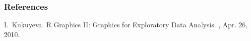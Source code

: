 \begin{frame}
	\frametitle{References}
		\begin{thebibliography}{Dijkstra, 1982}

			I.~Kukuyeva.
			\newblock \ttfamily R \normalfont Graphics II: Graphics for Exploratory Data Analysis.
			, Apr. 26, 2010.
		\end{thebibliography}
\end{frame}
